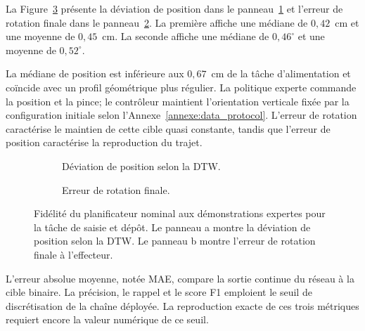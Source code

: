 La Figure~\ref{fig:pp_dist_err_FM} présente la déviation de position dans le panneau~\ref{fig:pp_dist_err_dtw} et l'erreur de rotation finale dans le panneau~\ref{fig:pp_dist_err_rotation}. La première affiche une médiane de $0{,}42$~cm et une moyenne de $0{,}45$~cm. La seconde affiche une médiane de $0{,}46^\circ$ et une moyenne de $0{,}52^\circ$.

La médiane de position est inférieure aux $0{,}67$~cm de la tâche d'alimentation et coïncide avec un profil géométrique plus régulier. La politique experte commande la position et la pince; le contrôleur maintient l'orientation verticale fixée par la configuration initiale selon l'Annexe~\ref{annexe:data_protocol}. L'erreur de rotation caractérise le maintien de cette cible quasi constante, tandis que l'erreur de position caractérise la reproduction du trajet.

\begin{figure}[!htbp]
    \centering
    \begin{subfigure}[b]{0.48\textwidth}
        \centering
        
        \caption{Déviation de position selon la \ac{DTW}.}\label{fig:pp_dist_err_dtw}
    \end{subfigure}
    \hfill
    \begin{subfigure}[b]{0.48\textwidth}
        \centering
        
        \caption{Erreur de rotation finale.}\label{fig:pp_dist_err_rotation}
    \end{subfigure}
    \caption[Fidélité du planificateur sur la saisie et dépôt]{Fidélité du planificateur nominal aux démonstrations expertes pour la tâche de saisie et dépôt. Le panneau a montre la déviation de position selon la \ac{DTW}. Le panneau b montre l'erreur de rotation finale à l'effecteur.}\label{fig:pp_dist_err_FM}
\end{figure}

L'erreur absolue moyenne, notée MAE, compare la sortie continue du réseau à la cible binaire. La précision, le rappel et le score F1 emploient le seuil de discrétisation de la chaîne déployée. La reproduction exacte de ces trois métriques requiert encore la valeur numérique de ce seuil.

